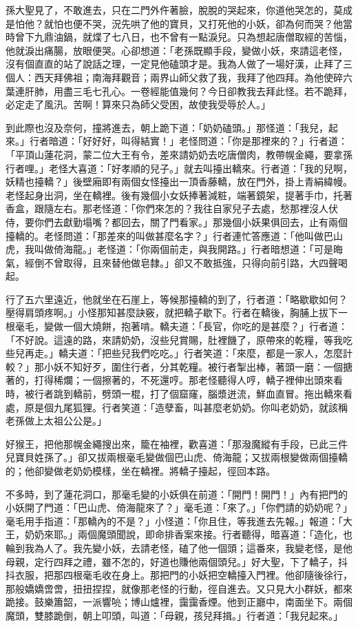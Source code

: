 孫大聖見了，不敢進去，只在二門外仵著臉，脫脫的哭起來，你道他哭怎的，莫成是怕他？就怕也便不哭，況先哄了他的寶貝，又打死他的小妖，卻為何而哭？他當時曾下九鼎油鍋，就煠了七八日，也不曾有一點淚兒。只為想起唐僧取經的苦惱，他就淚出痛腸，放眼便哭。心卻想道：「老孫既顯手段，變做小妖，來請這老怪，沒有個直直的站了說話之理，一定見他磕頭才是。我為人做了一場好漢，止拜了三個人：西天拜佛祖；南海拜觀音；兩界山師父救了我，我拜了他四拜。為他使碎六葉連肝肺，用盡三毛七孔心。一卷經能值幾何？今日卻教我去拜此怪。若不跪拜，必定走了風汛。苦啊！算來只為師父受困，故使我受辱於人。」

到此際也沒及奈何，撞將進去，朝上跪下道：「奶奶磕頭。」那怪道：「我兒，起來。」行者暗道：「好好好，叫得結實！」老怪問道：「你是那裡來的？」行者道：「平頂山蓮花洞，蒙二位大王有令，差來請奶奶去吃唐僧肉，教帶幌金繩，要拿孫行者哩。」老怪大喜道：「好孝順的兒子。」就去叫擡出轎來。行者道：「我的兒啊，妖精也擡轎？」後壁廂即有兩個女怪擡出一頂香藤轎，放在門外，掛上青絹緯幔。老怪起身出洞，坐在轎裡。後有幾個小女妖捧著減粧，端著鏡架，提著手巾，托著香盒，跟隨左右。那老怪道：「你們來怎的？我往自家兒子去處，愁那裡沒人伏侍，要你們去獻勤塌嘴？都回去，關了門看家。」那幾個小妖果俱回去，止有兩個擡轎的。老怪問道：「那差來的叫做甚麼名字？」行者連忙答應道：「他叫做巴山虎，我叫做倚海龍。」老怪道：「你兩個前走，與我開路。」行者暗想道：「可是晦氣，經倒不曾取得，且來替他做皂隸。」卻又不敢抵強，只得向前引路，大四聲喝起。

行了五六里遠近，他就坐在石崖上，等候那擡轎的到了，行者道：「略歇歇如何？壓得肩頭疼啊。」小怪那知甚麼訣竅，就把轎子歇下。行者在轎後，胸脯上拔下一根毫毛，變做一個大燒餅，抱著啃。轎夫道：「長官，你吃的是甚麼？」行者道：「不好說。這遠的路，來請奶奶，沒些兒賞賜，肚裡饑了，原帶來的乾糧，等我吃些兒再走。」轎夫道：「把些兒我們吃吃。」行者笑道：「來麼，都是一家人，怎麼計較？」那小妖不知好歹，圍住行者，分其乾糧。被行者掣出棒，著頭一磨：一個搪著的，打得稀爛；一個擦著的，不死還哼。那老怪聽得人哼，轎子裡伸出頭來看時，被行者跳到轎前，劈頭一棍，打了個窟窿，腦漿迸流，鮮血直冒。拖出轎來看處，原是個九尾狐狸。行者笑道：「造孽畜，叫甚麼老奶奶。你叫老奶奶，就該稱老孫做上太祖公公是。」

好猴王，把他那幌金繩搜出來，籠在袖裡，歡喜道：「那潑魔縱有手段，已此三件兒寶貝姓孫了。」卻又拔兩根毫毛變做個巴山虎、倚海龍；又拔兩根變做兩個擡轎的；他卻變做老奶奶模樣，坐在轎裡。將轎子擡起，徑回本路。

不多時，到了蓮花洞口，那毫毛變的小妖俱在前道：「開門！開門！」內有把門的小妖開了門道：「巴山虎、倚海龍來了？」毫毛道：「來了。」「你們請的奶奶呢？」毫毛用手指道：「那轎內的不是？」小怪道：「你且住，等我進去先報。」報道：「大王，奶奶來耶。」兩個魔頭聞說，即命排香案來接。行者聽得，暗喜道：「造化，也輪到我為人了。我先變小妖，去請老怪，磕了他一個頭；這番來，我變老怪，是他母親，定行四拜之禮，雖不怎的，好道也賺他兩個頭兒。」好大聖，下了轎子，抖抖衣服，把那四根毫毛收在身上。那把門的小妖把空轎擡入門裡。他卻隨後徐行，那般嬌嬌啻啻，扭扭捏捏，就像那老怪的行動，徑自進去。又只見大小群妖，都來跪接。鼓樂簫韶，一派響喨；博山爐裡，靄靄香煙。他到正廳中，南面坐下。兩個魔頭，雙膝跪倒，朝上叩頭，叫道：「母親，孩兒拜揖。」行者道：「我兒起來。」

